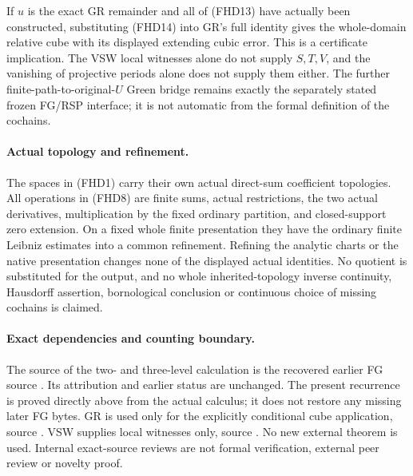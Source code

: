 If $u$ is the exact GR remainder and all of (FHD13) have actually
been constructed, substituting (FHD14) into GR's full identity
gives the whole-domain relative cube with its displayed extending
cubic error.  This is a certificate implication.  The VSW local
witnesses alone do not supply $S,T,V$, and the vanishing of
projective periods alone does not supply them either.  The further
finite-path-to-original-$U$ Green bridge remains exactly the
separately stated frozen FG/RSP interface; it is not automatic
from the formal definition of the cochains.

\paragraph{Actual topology and refinement.}
The spaces in (FHD1) carry their own actual direct-sum coefficient
topologies.  All operations in (FHD8) are finite sums, actual
restrictions, the two actual derivatives, multiplication by the
fixed ordinary partition, and closed-support zero extension.
On a fixed whole finite presentation they have the ordinary
finite Leibniz estimates into a common refinement.  Refining the
analytic charts or the native presentation changes none of the
displayed actual identities.  No quotient is substituted for the
output, and no whole inherited-topology inverse continuity,
Hausdorff assertion, bornological conclusion or continuous
choice of missing cochains is claimed.

\paragraph{Exact dependencies and counting boundary.}
The source of the two- and three-level calculation is the
recovered earlier FG source
.
Its attribution and earlier status are unchanged.  The present
recurrence is proved directly above from the actual calculus;
it does not restore any missing later FG bytes.  GR is used only
for the explicitly conditional cube application, source
.
VSW supplies local witnesses only, source
.
No new external theorem is used.  Internal exact-source reviews
are not formal verification, external peer review or novelty proof.
